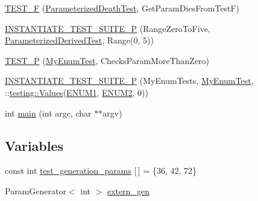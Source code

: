 \begin{DoxyCompactItemize}
\item 
\mbox{\hyperlink{_obj__test_2lib_2googletest-master_2googletest_2test_2googletest-param-test-test_8cc_a0eb7e27c6505d446a1bc3e4fe856a6b2}{T\+E\+S\+T\+\_\+F}} (\mbox{\hyperlink{class_parameterized_death_test}{Parameterized\+Death\+Test}}, Get\+Param\+Dies\+From\+TestF)
\item 
\mbox{\hyperlink{_obj__test_2lib_2googletest-master_2googletest_2test_2googletest-param-test-test_8cc_ae4ac2e7a7e07517b845246e2f16b6e76}{I\+N\+S\+T\+A\+N\+T\+I\+A\+T\+E\+\_\+\+T\+E\+S\+T\+\_\+\+S\+U\+I\+T\+E\+\_\+P}} (Range\+Zero\+To\+Five, \mbox{\hyperlink{class_parameterized_derived_test}{Parameterized\+Derived\+Test}}, Range(0, 5))
\item 
\mbox{\hyperlink{_obj__test_2lib_2googletest-master_2googletest_2test_2googletest-param-test-test_8cc_af93c1bfa3f3b8f1670128c9afc5143b2}{T\+E\+S\+T\+\_\+P}} (\mbox{\hyperlink{class_my_enum_test}{My\+Enum\+Test}}, Checks\+Param\+More\+Than\+Zero)
\item 
\mbox{\hyperlink{_obj__test_2lib_2googletest-master_2googletest_2test_2googletest-param-test-test_8cc_a6941458969980054942f74dd41cd731a}{I\+N\+S\+T\+A\+N\+T\+I\+A\+T\+E\+\_\+\+T\+E\+S\+T\+\_\+\+S\+U\+I\+T\+E\+\_\+P}} (My\+Enum\+Tests, \mbox{\hyperlink{class_my_enum_test}{My\+Enum\+Test}}, \+::\mbox{\hyperlink{namespacetesting_abd3c87b40c2a0663691c9b617ed5fcc2}{testing\+::\+Values}}(\mbox{\hyperlink{_obj__test_2lib_2googletest-master_2googletest_2test_2googletest-param-test-test_8cc_a057c666e39cf0735f5e7e74747124787ab4f50b5eb533127652f9dbca6bdf6c3d}{E\+N\+U\+M1}}, \mbox{\hyperlink{_obj__test_2lib_2googletest-master_2googletest_2test_2googletest-param-test-test_8cc_a057c666e39cf0735f5e7e74747124787ac3a9f8169cecee80b1d6d262cc1b83bd}{E\+N\+U\+M2}}, 0))
\item 
int \mbox{\hyperlink{_obj__test_2lib_2googletest-master_2googletest_2test_2googletest-param-test-test_8cc_a3c04138a5bfe5d72780bb7e82a18e627}{main}} (int argc, char $\ast$$\ast$argv)
\end{DoxyCompactItemize}
\subsection*{Variables}
\begin{DoxyCompactItemize}
\item 
const int \mbox{\hyperlink{_obj__test_2lib_2googletest-master_2googletest_2test_2googletest-param-test-test_8cc_aefe5c7eafc17e71cec010d92628bf84f}{test\+\_\+generation\+\_\+params}} \mbox{[}$\,$\mbox{]} = \{36, 42, 72\}
\item 
Param\+Generator$<$ int $>$ \mbox{\hyperlink{_obj__test_2lib_2googletest-master_2googletest_2test_2googletest-param-test-test_8cc_a0f691f1461778d71f30b1fb1dea1cb50}{extern\+\_\+gen}}
\end{DoxyCompactItemize}


